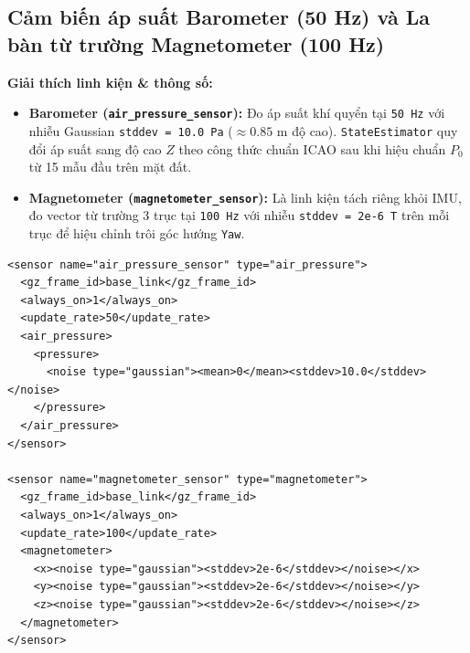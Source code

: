\documentclass[11pt,a4paper]{article}
\begin{document}
\vspace{1em}

\subsection{Cảm biến áp suất Barometer (50 Hz) và La bàn từ trường Magnetometer (100 Hz)}
\noindent
\begin{minipage}[t]{0.45\textwidth}
\vspace{0pt}
\textbf{Giải thích linh kiện \& thông số:}
\begin{itemize}
    \item \textbf{Barometer (\texttt{air\_pressure\_sensor}):} Đo áp suất khí quyển tại \texttt{50 Hz} với nhiễu Gaussian \texttt{stddev = 10.0 Pa} ($\approx 0.85\text{ m}$ độ cao). \texttt{StateEstimator} quy đổi áp suất sang độ cao $Z$ theo công thức chuẩn ICAO sau khi hiệu chuẩn $P_0$ từ 15 mẫu đầu trên mặt đất.
    \item \textbf{Magnetometer (\texttt{magnetometer\_sensor}):} Là linh kiện tách riêng khỏi IMU, đo vector từ trường 3 trục tại \texttt{100 Hz} với nhiễu \texttt{stddev = 2e-6 T} trên mỗi trục để hiệu chỉnh trôi góc hướng \texttt{Yaw}.
\end{itemize}
\end{minipage}
\hfill
\begin{minipage}[t]{0.52\textwidth}
\vspace{0pt}
\begin{lstlisting}[language=SDF, firstnumber=219]
<sensor name="air_pressure_sensor" type="air_pressure">
  <gz_frame_id>base_link</gz_frame_id>
  <always_on>1</always_on>
  <update_rate>50</update_rate>
  <air_pressure>
    <pressure>
      <noise type="gaussian"><mean>0</mean><stddev>10.0</stddev></noise>
    </pressure>
  </air_pressure>
</sensor>

<sensor name="magnetometer_sensor" type="magnetometer">
  <gz_frame_id>base_link</gz_frame_id>
  <always_on>1</always_on>
  <update_rate>100</update_rate>
  <magnetometer>
    <x><noise type="gaussian"><stddev>2e-6</stddev></noise></x>
    <y><noise type="gaussian"><stddev>2e-6</stddev></noise></y>
    <z><noise type="gaussian"><stddev>2e-6</stddev></noise></z>
  </magnetometer>
</sensor>
\end{lstlisting}
\end{minipage}

\vspace{1em}

\end{document}
